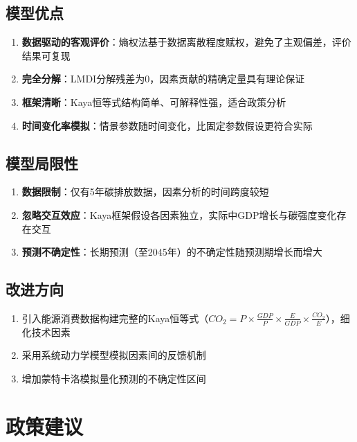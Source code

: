 \documentclass[12pt, a4paper]{article}
\begin{document}
\subsection{模型优点}

\begin{enumerate}
    \item \textbf{数据驱动的客观评价}：熵权法基于数据离散程度赋权，避免了主观偏差，评价结果可复现
    \item \textbf{完全分解}：LMDI分解残差为0，因素贡献的精确定量具有理论保证
    \item \textbf{框架清晰}：Kaya恒等式结构简单、可解释性强，适合政策分析
    \item \textbf{时间变化率模拟}：情景参数随时间变化，比固定参数假设更符合实际
\end{enumerate}

\subsection{模型局限性}

\begin{enumerate}
    \item \textbf{数据限制}：仅有5年碳排放数据，因素分析的时间跨度较短
    \item \textbf{忽略交互效应}：Kaya框架假设各因素独立，实际中GDP增长与碳强度变化存在交互
    \item \textbf{预测不确定性}：长期预测（至2045年）的不确定性随预测期增长而增大
\end{enumerate}

\subsection{改进方向}

\begin{enumerate}
    \item 引入能源消费数据构建完整的Kaya恒等式（$CO_2 = P \times \frac{GDP}{P} \times \frac{E}{GDP} \times \frac{CO_2}{E}$），细化技术因素
    \item 采用系统动力学模型模拟因素间的反馈机制
    \item 增加蒙特卡洛模拟量化预测的不确定性区间
\end{enumerate}

\section{政策建议}
\end{document}
